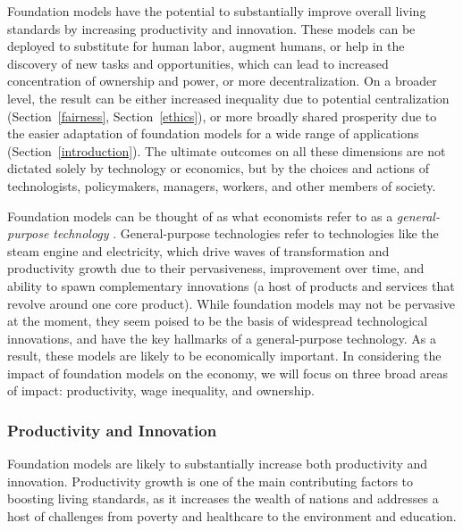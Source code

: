 Foundation models have the potential to substantially improve overall living standards by increasing productivity and innovation. These models can be deployed to substitute for human labor, augment humans, or help in the discovery of new tasks and opportunities, which can lead to increased concentration of ownership and power, or more decentralization. On a broader level, the result can be either increased inequality due to potential centralization (Section~\ref{fairness}, Section~\ref{ethics}), or more broadly shared prosperity due to the easier adaptation of foundation models for a wide range of applications (Section~\ref{introduction}).
The ultimate outcomes on all these dimensions are not dictated solely by technology or economics, but by the choices and actions of technologists, policymakers, managers, workers, and other members of society.

Foundation models can be thought of as what economists refer to as a \emph{general-purpose technology} \citep{Bresnahan1995}. General-purpose technologies refer to technologies like the steam engine and electricity, which drive waves of transformation and productivity growth due to their pervasiveness, improvement over time, and ability to spawn complementary innovations (a host of products and services that revolve around one core product). While foundation models may not be pervasive at the moment, they seem poised to be the basis of widespread technological innovations, and have the key hallmarks of a general-purpose technology. As a result, these models are likely to be economically important. In considering the impact of foundation models on the economy, we will focus on three broad areas of impact: productivity, wage inequality, and ownership.

\subsubsection{Productivity and Innovation} Foundation models are likely to substantially increase both productivity and innovation. Productivity growth is one of the main contributing factors to boosting living standards, as it increases the wealth of nations and addresses a host of challenges from poverty and healthcare to the environment and education.

